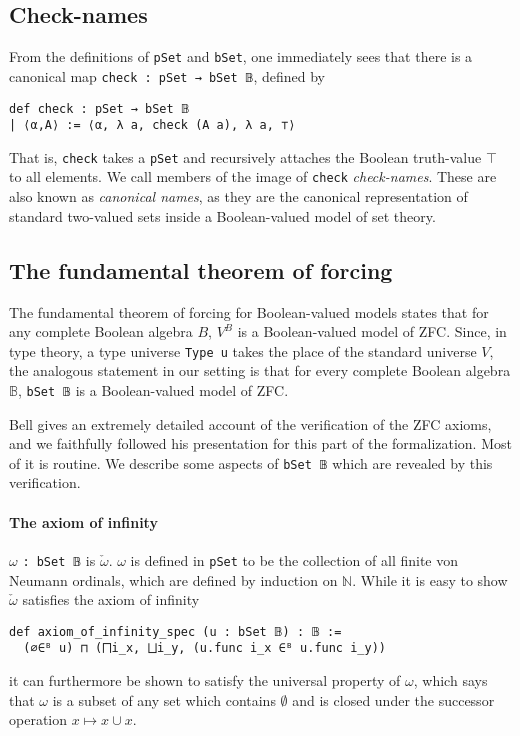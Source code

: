 \documentclass[a4paper,USenglish,cleveref, autoref]{lipics-v2019}
\newcommand{\B}{\mathbb{B}}
\newcommand{\lil}{\lstinline}
\theoremstyle{definition}
\begin{document}
\subsection{Check-names}
From the definitions of \lil{pSet} and \lil{bSet}, one immediately sees that there is a canonical map \lil{check : pSet → bSet 𝔹}, defined by
\begin{lstlisting}
def check : pSet → bSet 𝔹
| ⟨α,A⟩ := ⟨α, λ a, check (A a), λ a, ⊤⟩
\end{lstlisting}

That is, \lil{check} takes a \lil{pSet} and recursively attaches the Boolean truth-value $\top$ to all elements. We call members of the image of \lil{check} \emph{check-names}. These are also known as \emph{canonical names}, as they are the canonical representation of standard two-valued sets inside a Boolean-valued model of set theory.

\subsection{The fundamental theorem of forcing}

The fundamental theorem of forcing for Boolean-valued models \cite{hamkins-seabold1} states that for any complete Boolean algebra $B$, $V^B$ is a Boolean-valued model of ZFC. Since, in type theory, a type universe \lstinline{Type u} takes the place of the standard universe $V$, the analogous statement in our setting is that for every complete Boolean algebra $\B$, \lstinline{bSet 𝔹} is a Boolean-valued model of ZFC.

Bell \cite{bell1} gives an extremely detailed account of the verification of the ZFC axioms, and we faithfully followed his presentation for this part of the formalization. Most of it is routine. We describe some aspects of \lil{bSet 𝔹} which are revealed by this verification.

\paragraph*{The axiom of infinity}
$\omega$ \lil{: bSet 𝔹} is $\check{\omega}$. $\omega$ is defined in \lil{pSet} to be the collection of all finite von Neumann ordinals, which are defined by induction on $\mathbb{N}$. While it is easy to show $\check{\omega}$ satisfies the axiom of infinity
\begin{lstlisting}
def axiom_of_infinity_spec (u : bSet 𝔹) : 𝔹 :=
  (∅∈ᴮ u) ⊓ (⨅i_x, ⨆i_y, (u.func i_x ∈ᴮ u.func i_y))
\end{lstlisting}
it can furthermore be shown to satisfy the universal property of $\omega$, which says that $\omega$ is a subset of any set which contains $\emptyset$ and is closed under the successor operation $x \mapsto x \cup {x}$.
\end{document}
